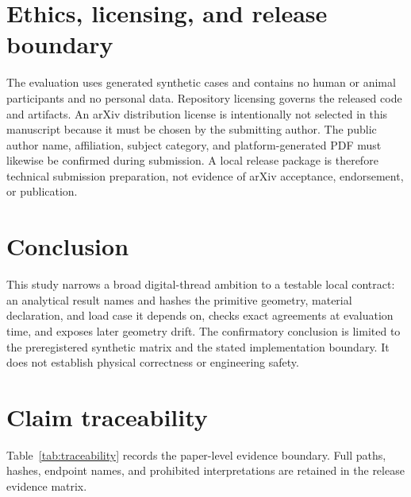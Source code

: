 \documentclass[10pt]{article}
\begin{document}
\section{Ethics, licensing, and release boundary}

The evaluation uses generated synthetic cases and contains no human or animal
participants and no personal data. Repository licensing governs the released
code and artifacts. An arXiv distribution license is intentionally not selected
in this manuscript because it must be chosen by the submitting author. The
public author name, affiliation, subject category, and platform-generated PDF
must likewise be confirmed during submission. A local release package is
therefore technical submission preparation, not evidence of arXiv acceptance,
endorsement, or publication.

\section{Conclusion}

This study narrows a broad digital-thread ambition to a testable local
contract: an analytical result names and hashes the primitive geometry,
material declaration, and load case it depends on, checks exact agreements at
evaluation time, and exposes later geometry drift. The confirmatory conclusion
is limited to the preregistered synthetic matrix and the stated implementation
boundary. It does not establish physical correctness or engineering safety.

\appendix
\section{Claim traceability}

Table~\ref{tab:traceability} records the paper-level evidence boundary. Full
paths, hashes, endpoint names, and prohibited interpretations are retained in
the release evidence matrix.
\end{document}
